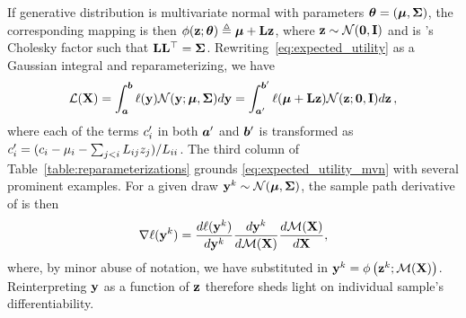 If generative distribution \belief{} is multivariate normal with parameters \(\boldsymbol{\theta} = (\boldsymbol{\mu}, \boldsymbol{\Sigma})\), the corresponding mapping is then \(\phi(\mathbf{z}; \boldsymbol{\theta}) \triangleq \boldsymbol{\mu} + \mathbf{L}\mathbf{z}\), where \(\mathbf{z} \sim \mathcal{N}(\mathbf{0}, \mathbf{I})\) and \Chol{} is \Cov's Cholesky factor such that \(\mathbf{L}\mathbf{L}^\top = \boldsymbol{\Sigma}\). Rewriting~\eqref{eq:expected_utility} as a Gaussian integral and reparameterizing, we have
\begin{align}
\mathcal{L}(\mathbf{X}) 
	=\int_{\boldsymbol{a}}^{\boldsymbol{b}}
		\ell(\mathbf{y})
		\mathcal{N}(\mathbf{y}; \boldsymbol{\mu}, \boldsymbol{\Sigma})
		d\mathbf{y}
	= \int_{\boldsymbol{a}^\prime}^{\boldsymbol{b}^\prime}
		\ell(\boldsymbol{\mu} + \mathbf{L}\mathbf{z})
		\mathcal{N}(\mathbf{z}; \mathbf{0}, \mathbf{I})
		d\mathbf{z}\,,
\label{eq:expected_utility_mvn}
\end{align}
where each of the \parallelism{} terms \(c^\prime_i\) in both \(\boldsymbol{a}^\prime\) and \(\boldsymbol{b}^\prime\) is transformed as \(c^\prime_{i} = (c_i - \mu_{i} - \sum_{j<i}L_{i j}z_{j})/L_{ii}\). The third column of Table~\ref{table:reparameterizations} grounds \eqref{eq:expected_utility_mvn} with several prominent examples. For a given draw \(\mathbf{y}^{k} \sim \mathcal{N}(\boldsymbol{\mu}, \boldsymbol{\Sigma})\), the sample path derivative of \acq{} \wrt{} \X{} is then
\begin{align}
\nabla\ell(\mathbf{y}^{k}) = 
	\frac{d\ell(\mathbf{y}^{k})}{d\mathbf{y}^{k}}
    \frac{d\mathbf{y}^{k}}{d\mathcal{M}(\mathbf{X})}
    \frac{d\mathcal{M}(\mathbf{X})}{d\mathbf{X}},
\end{align}
where, by minor abuse of notation, we have substituted in \(\mathbf{y}^{k} = \phi\left(\mathbf{z}^{k}; \mathcal{M}(\mathbf{X})\right)\). 
% 
Reinterpreting \(\mathbf{y}\) as a function of \(\mathbf{z}\) therefore sheds light on individual \MC sample's differentiability.


